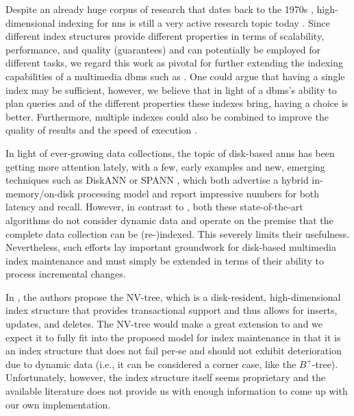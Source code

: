 Despite an already huge corpus of research that dates back to the 1970s \cite{Bentley:1975Multidimensional,Guttmann:1984RTrees,Beckmann:1990RTree,Indyk1998:Approximate,Weber:1998Va,Jegou:2010Product}, high-dimensional indexing for \acrshort{nns} is still a very active research topic today \cite{Shimomura:2021Survey,Kraska:2018Case}. Since different index structures provide different properties in terms of scalability, performance, and quality (guarantees) and can potentially be employed for different tasks, we regard this work as pivotal for further extending the indexing capabilities of a multimedia \acrshort{dbms} such as \cottontail{}. One could argue that having a single index may be sufficient, however, we believe that in light of a \acrshort{dbms}'s ability to plan queries and of the different properties these indexes bring, having a choice is better. Furthermore, multiple indexes could also be combined to improve the quality of results and the speed of execution \cite{Giangreco:2018Database}.

In light of ever-growing data collections, the topic of disk-based \acrshort{anns} has been getting more attention lately, with a few, early examples \cite{Lejsek:2011NVTree,Lejsek:2009NVTree,Gudmundsson:2010Large} and new, emerging techniques such as DiskANN \cite{Jayaram:2019DiskANN} or SPANN \cite{Chen:2021SPANN}, which both advertise a hybrid in-memory/on-disk processing model and report impressive numbers for both latency and recall. However, in contrast to \cite{Lejsek:2011NVTree,Lejsek:2009NVTree,Hojsgaard:2019Index}, both these state-of-the-art algorithms do not consider dynamic data and operate on the premise that the complete data collection can be (re-)indexed. This severely limits their usefulness. Nevertheless, such efforts lay important groundwork for disk-based multimedia index maintenance and must simply be extended in terms of their ability to process incremental changes.

In \cite{Lejsek:2011NVTree,Lejsek:2009NVTree}, the authors propose the NV-tree, which is a disk-resident, high-dimensional index structure that provides transactional support \cite{Lejsek:2018Transactional} and thus allows for inserts, updates, and deletes. The NV-tree would make a great extension to \cottontail{} and we expect it to fully fit into the proposed model for index maintenance in that it is an index structure that does not fail per-se and should not exhibit deterioration due to dynamic data (i.e., it can be considered a corner case, like the $B^{+}$-tree). Unfortunately, however, the index structure itself seems proprietary and the available literature does not provide us with enough information to come up with our own implementation.

